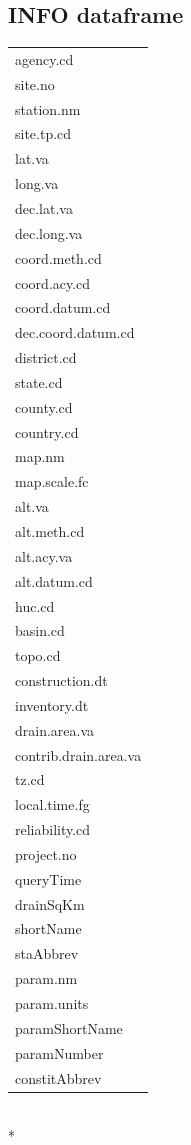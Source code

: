 \documentclass[a4paper,11pt]{article}
\begin{document}
\subsection{INFO dataframe}
\label{sec:appendix2INFO}
\begin{tabular}{l}
  \hline
  \hline
agency.cd \\ 
  site.no \\ 
  station.nm \\ 
  site.tp.cd \\ 
  lat.va \\ 
  long.va \\ 
  dec.lat.va \\ 
  dec.long.va \\ 
  coord.meth.cd \\ 
  coord.acy.cd \\ 
  coord.datum.cd \\ 
  dec.coord.datum.cd \\ 
  district.cd \\ 
  state.cd \\ 
  county.cd \\ 
  country.cd \\ 
  map.nm \\ 
  map.scale.fc \\ 
  alt.va \\ 
  alt.meth.cd \\ 
  alt.acy.va \\ 
  alt.datum.cd \\ 
  huc.cd \\ 
  basin.cd \\ 
  topo.cd \\ 
  construction.dt \\ 
  inventory.dt \\ 
  drain.area.va \\ 
  contrib.drain.area.va \\ 
  tz.cd \\ 
  local.time.fg \\ 
  reliability.cd \\ 
  project.no \\ 
  queryTime \\ 
  drainSqKm \\ 
  shortName \\ 
  staAbbrev \\ 
  param.nm \\ 
  param.units \\ 
  paramShortName \\ 
  paramNumber \\ 
  constitAbbrev \\ 
   \hline
\end{tabular}
\\*
\end{document}
